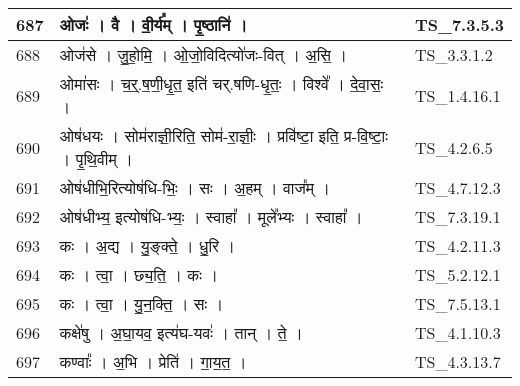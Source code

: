 \documentclass[17pt]{extarticle}
\begin{document}
\begin{longtable}{||p{0.4in}||p{4.9in}||p{0.9in}||}
    \hline
        
    687 & ओजः॑   ।   वै   ।   वी॒र्य᳚म्   ।   पृ॒ष्ठानि॑   ।    & TS\_7.3.5.3       \\
    
    \hline
        
    688 & ओज॑से   ।   जु॒हो॒मि॒   ।   ओ॒जो॒विदित्यो॑जः{-}वित्   ।   अ॒सि॒   ।    & TS\_3.3.1.2       \\
    
    \hline
        
    689 & ओमा॑सः   ।   च॒र्॒.ष॒णी॒धृ॒त॒ इति॑ चर्.षणि{-}धृ॒तः॒   ।   विश्वे᳚   ।   दे॒वा॒सः॒   ।    & TS\_1.4.16.1       \\
    
    \hline
        
    690 & ओष॑धयः   ।   सोम॑राज्ञी॒रिति॒ सोम॑{-}रा॒ज्ञीः॒   ।   प्रवि॑ष्टा॒ इति॒ प्र{-}वि॒ष्टाः॒   ।   पृ॒थि॒वीम्   ।    & TS\_4.2.6.5       \\
    
    \hline
        
    691 & ओष॑धीभि॒रित्योष॑धि{-}भिः॒   ।   सः   ।   अ॒हम्   ।   वाज᳚म्   ।    & TS\_4.7.12.3       \\
    
    \hline
        
    692 & ओष॑धीभ्य॒ इत्योष॑धि{-}भ्यः॒   ।   स्वाहा᳚   ।   मूले᳚भ्यः   ।   स्वाहा᳚   ।    & TS\_7.3.19.1       \\
    
    \hline
        
    693 & कः   ।   अ॒द्य   ।   यु॒ङ्क्ते॒   ।   धु॒रि   ।    & TS\_4.2.11.3       \\
    
    \hline
        
    694 & कः   ।   त्वा॒   ।   छ्य॒ति॒   ।   कः   ।    & TS\_5.2.12.1       \\
    
    \hline
        
    695 & कः   ।   त्वा॒   ।   यु॒न॒क्ति॒   ।   सः   ।    & TS\_7.5.13.1       \\
    
    \hline
        
    696 & कक्षे॑षु   ।   अ॒घा॒यव॒ इत्य॑घ{-}यवः॑   ।   तान्   ।   ते॒   ।    & TS\_4.1.10.3       \\
    
    \hline
        
    697 & कण्वाः᳚   ।   अ॒भि   ।   प्रेति॑   ।   गा॒य॒त॒   ।    & TS\_4.3.13.7       \\
    

\end{longtable}
\end{document}
